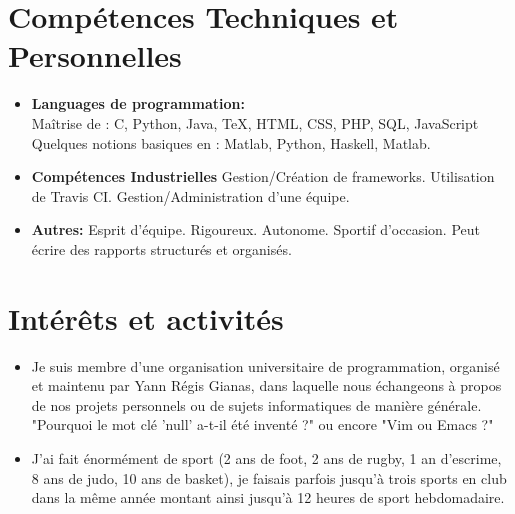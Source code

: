 \documentclass[11pt,a4paper,sans]{moderncv}        %
\begin{document}
\newpage

\section{Compétences Techniques et Personnelles}

\vspace{6pt}

\begin{itemize}

\item \textbf{Languages de programmation:} \\ Maîtrise de : C, Python, Java, TeX, HTML, CSS, PHP, SQL, JavaScript \\ Quelques notions basiques en : Matlab, Python, Haskell, Matlab.

\vspace{6pt}

\item \textbf{Compétences Industrielles} Gestion/Création de frameworks. Utilisation de Travis CI. Gestion/Administration d'une équipe.

\vspace{6pt}

\item \textbf{Autres:} Esprit d'équipe. Rigoureux. Autonome. Sportif d'occasion. Peut écrire des rapports structurés et organisés.

\end{itemize}

\section{Intérêts et activités}

\vspace{6pt}

\begin{itemize}

\item{Je suis membre d'une organisation universitaire de programmation, organisé et maintenu par Yann Régis Gianas, dans laquelle nous échangeons à propos de nos projets personnels ou de sujets informatiques de manière générale. "Pourquoi le mot clé 'null' a-t-il été inventé ?" ou encore "Vim ou Emacs ?"}

\vspace{6pt}

\item{J'ai fait énormément de sport (2 ans de foot, 2 ans de rugby, 1 an d'escrime, 8 ans de judo, 10 ans de basket), je faisais parfois jusqu'à trois sports en club dans la même année montant ainsi jusqu'à 12 heures de sport hebdomadaire.}

\end{itemize}
\end{document}
